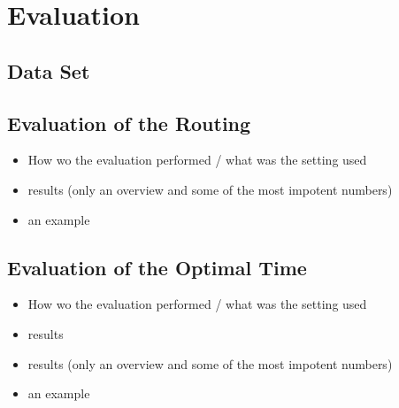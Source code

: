 
\section{Evaluation}


\subsection{Data Set}

\subsection{Evaluation of the Routing}

\begin{itemize}
	\item How wo the evaluation performed / what was the setting used
	\item results (only an overview and some of the most impotent numbers)
	\item an example
\end{itemize}

\subsection{Evaluation of the Optimal Time}

\begin{itemize}
	\item How wo the evaluation performed / what was the setting used
	\item results
	\item results (only an overview and some of the most impotent numbers)
	\item an example
\end{itemize}

